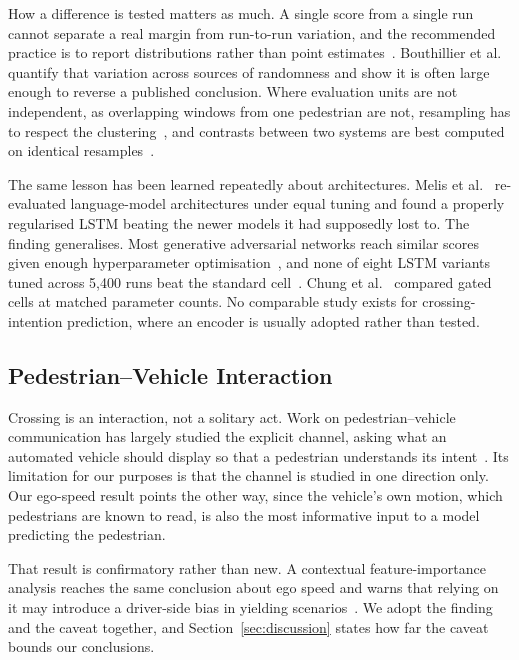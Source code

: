 \documentclass[mti,article,submit,moreauthors]{Definitions/mdpi}
\begin{document}
How a difference is tested matters as much. A single score from a single run cannot separate a real margin from run-to-run variation, and the recommended practice is to report distributions rather than point estimates~\citep{reimers2017reporting}. Bouthillier et al.~\citep{bouthillier2021variance} quantify that variation across sources of randomness and show it is often large enough to reverse a published conclusion. Where evaluation units are not independent, as overlapping windows from one pedestrian are not, resampling has to respect the clustering~\citep{fieldwelsh2007}, and contrasts between two systems are best computed on identical resamples~\citep{koehn2004significance}.

The same lesson has been learned repeatedly about architectures. Melis et al.~\citep{melis2018sota} re-evaluated language-model architectures under equal tuning and found a properly regularised LSTM beating the newer models it had supposedly lost to. The finding generalises. Most generative adversarial networks reach similar scores given enough hyperparameter optimisation~\citep{lucic2018gans}, and none of eight LSTM variants tuned across 5,400 runs beat the standard cell~\citep{greff2017odyssey}. Chung et al.~\citep{chung2014gru} compared gated cells at matched parameter counts. No comparable study exists for crossing-intention prediction, where an encoder is usually adopted rather than tested.

\subsection{Pedestrian--Vehicle Interaction}

Crossing is an interaction, not a solitary act. Work on pedestrian--vehicle communication has largely studied the explicit channel, asking what an automated vehicle should display so that a pedestrian understands its intent~\citep{rouchitsas2019ehmi,alhawiti2024ehmi}. Its limitation for our purposes is that the channel is studied in one direction only. Our ego-speed result points the other way, since the vehicle's own motion, which pedestrians are known to read, is also the most informative input to a model predicting the pedestrian.

That result is confirmatory rather than new. A contextual feature-importance analysis reaches the same conclusion about ego speed and warns that relying on it may introduce a driver-side bias in yielding scenarios~\citep{azarmi2024featureimportance}. We adopt the finding and the caveat together, and Section~\ref{sec:discussion} states how far the caveat bounds our conclusions.
\end{document}

